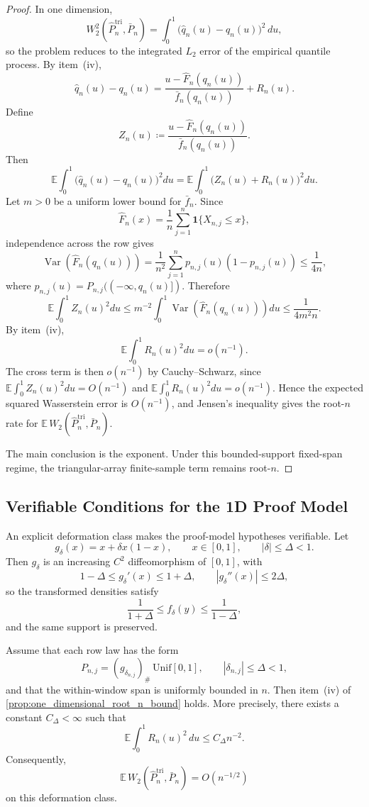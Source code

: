 \begin{proof}
In one dimension,
\[
  W_2^2\!\left(\widehat P_n^{\mathrm{tri}},\bar P_n\right)
  = \int_0^1 \bigl(\widehat q_n(u)-q_n(u)\bigr)^2\,du,
\]
so the problem reduces to the integrated $L_2$ error of the empirical quantile
process. By item~(iv),
\[
  \widehat q_n(u)-q_n(u)
  =
  \frac{u-\widehat F_n(q_n(u))}{\bar f_n(q_n(u))} + R_n(u).
\]
Define
\[
  Z_n(u)\coloneqq \frac{u-\widehat F_n(q_n(u))}{\bar f_n(q_n(u))}.
\]
Then
\[
  \mathbb E\int_0^1 \bigl(\widehat q_n(u)-q_n(u)\bigr)^2du
  =
  \mathbb E\int_0^1 \bigl(Z_n(u)+R_n(u)\bigr)^2du.
\]
Let $m>0$ be a uniform lower bound for $\bar f_n$. Since
\[
  \widehat F_n(x)=\frac1n\sum_{j=1}^n \mathbf 1\{X_{n,j}\le x\},
\]
independence across the row gives
\[
  \operatorname{Var}(\widehat F_n(q_n(u)))
  =
  \frac{1}{n^2}\sum_{j=1}^n p_{n,j}(u)(1-p_{n,j}(u))
  \le \frac{1}{4n},
\]
where $p_{n,j}(u)=P_{n,j}(({-}\infty,q_n(u)])$. Therefore
\[
  \mathbb E\int_0^1 Z_n(u)^2du
  \le
  m^{-2}\int_0^1 \operatorname{Var}(\widehat F_n(q_n(u)))du
  \le \frac{1}{4m^2 n}.
\]
By item~(iv),
\[
  \mathbb E\int_0^1 R_n(u)^2du=o(n^{-1}).
\]
The cross term is then $o(n^{-1})$ by Cauchy--Schwarz, since
\(
  \mathbb E\int_0^1 Z_n(u)^2du=O(n^{-1})
\)
and
\(
  \mathbb E\int_0^1 R_n(u)^2du=o(n^{-1})
\).
Hence the expected squared Wasserstein error is $O(n^{-1})$, and Jensen's
inequality gives the root-$n$ rate for
$\mathbb E\,W_2\!\left(\widehat P_n^{\mathrm{tri}},\bar P_n\right)$.

The main conclusion is the exponent. Under this bounded-support fixed-span
regime, the triangular-array finite-sample term remains root-$n$.
\end{proof}

\subsection{Verifiable Conditions for the 1D Proof Model}

An explicit deformation class makes the proof-model hypotheses verifiable. Let
\[
  g_\delta(x)=x+\delta x(1-x), \qquad x\in[0,1], \qquad |\delta|\le \Delta<1.
\]
Then $g_\delta$ is an increasing $C^2$ diffeomorphism of $[0,1]$, with
\[
  1-\Delta \le g_\delta'(x) \le 1+\Delta, \qquad |g_\delta''(x)|\le 2\Delta,
\]
so the transformed densities satisfy
\[
  \frac{1}{1+\Delta}\le f_\delta(y) \le \frac{1}{1-\Delta},
\]
and the same support is preserved.

\begin{corollary}
\label{cor:bahadur_sufficient_conditions_smooth_deformation}
Assume that each row law has the form
\[
  P_{n,j}=(g_{\delta_{n,j}})_\#\,\mathrm{Unif}[0,1],
  \qquad |\delta_{n,j}|\le \Delta<1,
\]
and that the within-window span is uniformly bounded in $n$. Then item~(iv) of
\cref{prop:one_dimensional_root_n_bound} holds. More precisely, there exists a
constant $C_\Delta<\infty$ such that
\[
  \mathbb E\int_0^1 R_n(u)^2\,du \le C_\Delta n^{-2}.
\]
Consequently,
\[
  \mathbb E\,W_2\!\left(\widehat P_n^{\mathrm{tri}},\bar P_n\right)=O(n^{-1/2})
\]
on this deformation class.
\end{corollary}

